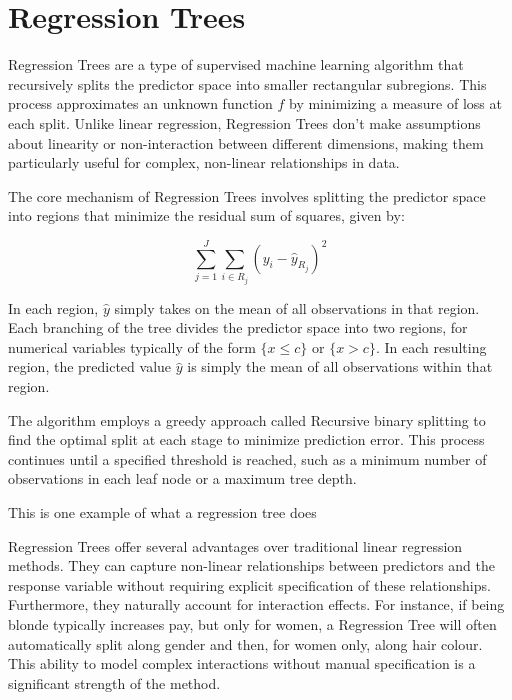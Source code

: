 \documentclass[12pt]{article}
\begin{document}
\section{Regression Trees}

Regression Trees are a type of supervised machine learning algorithm that recursively splits the predictor space into smaller rectangular subregions. This process approximates an unknown function $f$ by minimizing a measure of loss at each split. Unlike linear regression, Regression Trees don't make assumptions about linearity or non-interaction between different dimensions, making them particularly useful for complex, non-linear relationships in data.

The core mechanism of Regression Trees involves splitting the predictor space into regions that minimize the residual sum of squares, given by:

\begin{equation}
    \sum_{j=1}^{J} \sum_{i \in R_j} ( y_i- \hat{ y}_{R_j} )^2
\end{equation}



In each region, $\hat{y}$ simply takes on the mean of all observations in that region.
Each branching of the tree divides the predictor space into two regions, for numerical variables typically of the form $\{x \le c\}$ or $\{x > c\}$. In each resulting region, the predicted value $\hat{y}$ is simply the mean of all observations within that region.

The algorithm employs a greedy approach called Recursive binary splitting to find the optimal split at each stage to minimize prediction error. This process continues until a specified threshold is reached, such as a minimum number of observations in each leaf node or a maximum tree depth.



This is one example of what a regression tree does %



Regression Trees offer several advantages over traditional linear regression methods. They can capture non-linear relationships between predictors and the response variable without requiring explicit specification of these relationships. Furthermore, they naturally account for interaction effects. For instance, if being blonde typically increases pay, but only for women, a Regression Tree will often automatically split along gender and then, for women only, along hair colour. This ability to model complex interactions without manual specification is a significant strength of the method.
\end{document}
